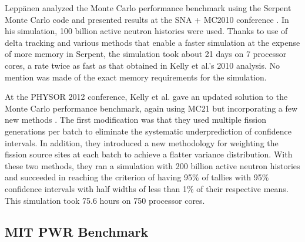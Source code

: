 Leppänen analyzed the Monte Carlo performance benchmark using the Serpent Monte
Carlo code \cite{vtt-leppanen-2007} and presented results at the SNA + MC2010
conference \cite{sna-leppanen-2010}. In his simulation, 100 billion active
neutron histories were used. Thanks to use of delta tracking and various methods
that enable a faster simulation at the expense of more memory in Serpent, the
simulation took about 21 days on 7 processor cores, a rate twice as fast as that
obtained in Kelly et al.'s 2010 analysis. No mention was made of the exact
memory requirements for the simulation.

At the PHYSOR 2012 conference, Kelly et al. gave an updated solution to the
Monte Carlo performance benchmark, again using MC21 but incorporating a few new
methods \cite{physor-kelly-2012}. The first modification was that they used
multiple fission generations per batch to eliminate the systematic
underprediction of confidence intervals. In addition, they introduced a new
methodology for weighting the fission source sites at each batch to achieve a
flatter variance distribution. With these two methods, they ran a simulation
with 200 billion active neutron histories and succeeded in reaching the
criterion of having 95\% of tallies with 95\% confidence intervals with half
widths of less than 1\% of their respective means. This simulation took 75.6
hours on 750 processor cores.

\subsection{MIT PWR Benchmark}


